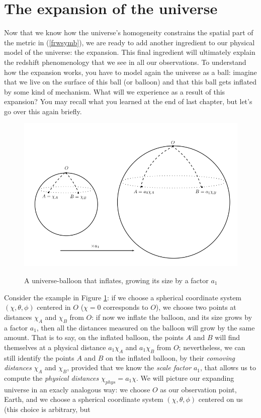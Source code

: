 \documentclass[11pt, a4paper,oneside,openright]{book}
\numberwithin{equation}{section}
\begin{document}
\section{The expansion of the universe}
Now that we know how the universe's homogeneity constrains the spatial part of the metric in (\ref{frwsymb}), we are ready to add another ingredient to our physical model of the universe: the expansion. This final ingredient will ultimately explain the redshift phenomenology that we see in all our observations. To understand how the expansion works, you have to model again the universe as a ball: imagine that we live on the surface of this ball (or balloon) and that this ball gets inflated by some kind of mechanism. What will we experience as a result of this expansion? You may recall what you learned at the end of last chapter, but let's go over this again briefly. 
\begin{figure}
\begin{center}
\includegraphics[scale=0.8]{Draw/expansion.png}
\label{}
\end{center}
\caption{A universe-balloon that inflates, growing its size by a factor $a_1$}
\label{expansion}
\end{figure}
Consider the example in Figure \ref{expansion}: if we choose a spherical coordinate system $(\chi,\theta,\phi)$ centered in $O$ ($\chi=0$ corresponds to $O$), we choose two points at distances $\chi_A$ and $\chi_B$ from $O$: if now we inflate the balloon, and its size grows by a factor $a_1$, then all the distances measured on the balloon will grow by the same amount. That is to say, on the inflated balloon, the points $A$ and $B$ will find themselves at a physical distance $a_1\chi_A$ and $a_1\chi_B$ from $O$; nevertheless, we can still identify the points $A$ and $B$ on the inflated balloon, by their \textit{comoving distances} $\chi_A$ and $\chi_B$, provided that we know the \textit{scale factor} $a_1$, that allows us to compute the \textit{physical distances} $\chi_{phys}=a_1\chi$. We will picture our expanding universe in an exacly analogous way: we choose $O$ as our observation point, Earth, and we choose a spherical coordinate system $(\chi,\theta,\phi)$ centered on us (this choice is arbitrary, but 
\end{document}
